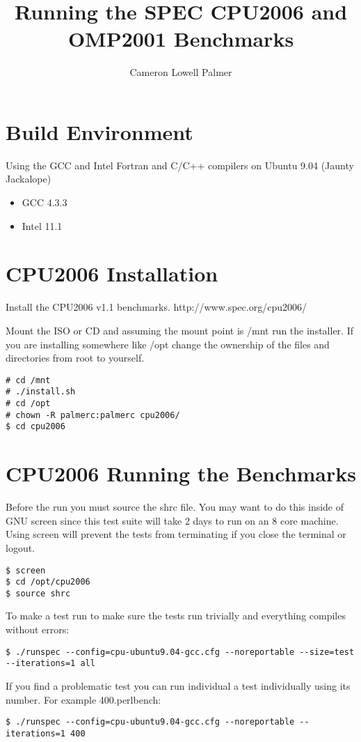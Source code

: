 \documentclass[12pt,twoside,a4paper]{article}
\title{Running the SPEC CPU2006 and OMP2001 Benchmarks}
\author{Cameron Lowell Palmer}
\begin{document}
\maketitle
\section{Build Environment}
Using the GCC and Intel Fortran and C/C++ compilers on Ubuntu 9.04 (Jaunty Jackalope)

\begin{itemize}
\item GCC 4.3.3
\item Intel 11.1
\end{itemize}

\section{CPU2006 Installation}
Install the CPU2006 v1.1 benchmarks. http://www.spec.org/cpu2006/

Mount the ISO or CD and assuming the mount point is /mnt run the installer. If you are installing somewhere like /opt change the ownership of the files and directories from root to yourself.

\begin{lstlisting}
# cd /mnt
# ./install.sh
# cd /opt
# chown -R palmerc:palmerc cpu2006/
$ cd cpu2006
\end{lstlisting}

\section{CPU2006 Running the Benchmarks}
Before the run you must source the shrc file. You may want to do this inside of GNU screen since this test suite will
take 2 days to run on an 8 core machine. Using screen will prevent the tests from terminating if you close the terminal or logout.
\begin{lstlisting}
$ screen
$ cd /opt/cpu2006
$ source shrc
\end{lstlisting}

To make a test run to make sure the tests run trivially and everything compiles without errors:
\begin{lstlisting}
$ ./runspec --config=cpu-ubuntu9.04-gcc.cfg --noreportable --size=test --iterations=1 all
\end{lstlisting}

If you find a problematic test you can run individual a test individually using its number. For example 400.perlbench:
\begin{lstlisting}
$ ./runspec --config=cpu-ubuntu9.04-gcc.cfg --noreportable --iterations=1 400
\end{lstlisting}
\end{document}
